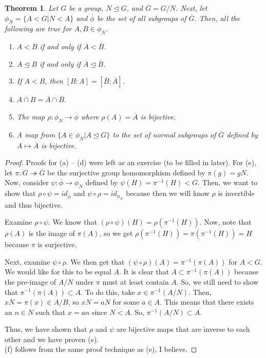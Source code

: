 \documentclass[11pt,leqno,oneside]{amsart}
\newcommand{\subgroup}{\mathrel{<}}
\newcommand{\normsubgroup}{\mathrel{\unlhd}}
\newtheorem{thm}{Theorem}[subsection]
\theoremstyle{definition}
\numberwithin{equation}{section}
\begin{document}
\begin{thm}
    Let $G$ be a group, $N \normsubgroup G$, and $\overline{G} = G/N$. Next, let
    $\phi_N = \{ A \subgroup G | N \subgroup A \}$ and $\overline{\phi}$ be the
    set of all subgroups of $\overline{G}$. Then, all the following are true for $A,B \in \phi_N$.
    \begin{enumerate}[label=(\alph*)]
        \item $A \subgroup B$ if and only if $\overline{A} \subgroup \overline{B}$.
        \item $A \normsubgroup B$ if and only if $\overline{A} \normsubgroup
            \overline{B}$.
        \item If $A \subgroup B$, then $[B:A] = [\overline{B}:\overline{A}]$.
        \item $\overline{A \cap B} = \overline{A} \cap \overline{B}$.
        \item The map $\rho: \phi_N \to \overline{\phi}$ where $\rho(A) =
            \overline{A}$ is bijective.
        \item A map from $\{ A \in \phi_N | A \normsubgroup G\}$ to the set of
            normal subgroups of $\overline{G}$ defined by $A \mapsto
            \overline{A}$ is bijective.
    \end{enumerate}
\end{thm}
\begin{proof}
    Proofs for (a) -- (d) were left as an exercise (to be filled in later).
    For (e), let $\pi: G \twoheadrightarrow \overline{G}$ be the surjective
    group homomorphism defined by $\pi(g) = gN$. Now, consider $\psi:
    \overline{\phi} \to \phi_N$ defined by $\psi(H) = \pi^{-1}(H) \subgroup G$.
    Then, we want to show that $\rho \circ \psi = id_{\overline{\phi}}$ and
    $\psi \circ \rho = id_{\phi_N}$ because then we will know $\rho$ is
    invertible and thus bijective.

    Examine $\rho \circ \psi$. We know that $(\rho \circ \psi)(H) =
    \rho(\pi^{-1}(H))$. Now, note that $\rho(A)$ is the image of $\pi(A)$, so
    we get $\rho(\pi^{-1}(H)) = \pi(\pi^{-1}(H)) = H$ because $\pi$ is
    surjective.

    Next, examine $\psi \circ \rho$. We then get that $(\psi \circ \rho)(A) =
    \pi^{-1}(\pi(A))$ for $A \subgroup G$. We would like for this to be equal
    $A$. It is clear that $A \subset \pi^{-1}(\pi(A))$ because the pre-image of
    $A/N$ under $\pi$ must at least contain $A$. So, we still need to show that
    $\pi^{-1}(\pi(A)) \subset A$. To do this, take $x \in \pi^{-1}(A/N)$. Then,
    $xN = \pi(x) \in A/B$, so $xN = aN$ for some $a \in A$. This means that
    there exists an $n \in N$ such that $x = an$ since $N \subgroup A$. So,
    $\pi^{-1}(A/N) \subset A$.

    Thus, we have shown that $\rho$ and $\psi$ are bijective maps that are
    inverse to each other and we have proven (e). \\

    (f) follows from the same proof technique as (e), I believe.
\end{proof}
\end{document}
